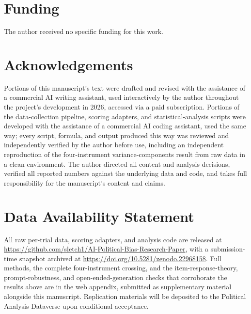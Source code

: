 \documentclass[12pt]{article}
\begin{document}
\section*{Funding}

The author received no specific funding for this work.

\section*{Acknowledgements}

Portions of this manuscript's text were drafted and revised with the
assistance of a commercial AI writing assistant, used interactively by the
author throughout the project's development in 2026, accessed via a paid
subscription. Portions of the data-collection pipeline, scoring adapters,
and statistical-analysis scripts were developed with the assistance of a
commercial AI coding assistant, used the same way; every script, formula,
and output produced this way was reviewed and independently verified by
the author before use, including an independent reproduction of the
four-instrument variance-components result from raw data in a clean
environment. The author directed all content and analysis decisions,
verified all reported numbers against the underlying data and code, and
takes full responsibility for the manuscript's content and claims.

\section*{Data Availability Statement}

All raw per-trial data, scoring adapters, and analysis code are released at
\url{https://github.com/sletch1/AI-Political-Bias-Research-Paper}, with a
submission-time snapshot archived at
\url{https://doi.org/10.5281/zenodo.22968158}. Full methods, the complete
four-instrument crossing, and the item-response-theory, prompt-robustness,
and open-ended-generation checks that corroborate the results above are in
the web appendix, submitted as supplementary material alongside this
manuscript. Replication materials will be deposited to the Political
Analysis Dataverse upon conditional acceptance.
\end{document}
